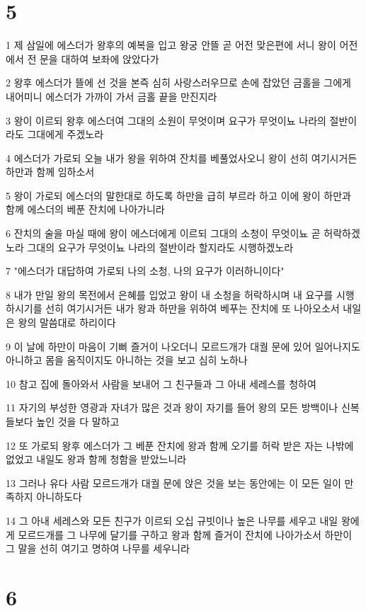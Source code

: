 \chapter{5}

\par 1 제 삼일에 에스더가 왕후의 예복을 입고 왕궁 안뜰 곧 어전 맞은편에 서니 왕이 어전에서 전 문을 대하여 보좌에 앉았다가
\par 2 왕후 에스더가 뜰에 선 것을 본즉 심히 사랑스러우므로 손에 잡았던 금홀을 그에게 내어미니 에스더가 가까이 가서 금홀 끝을 만진지라
\par 3 왕이 이르되 왕후 에스더여 그대의 소원이 무엇이며 요구가 무엇이뇨 나라의 절반이라도 그대에게 주겠노라
\par 4 에스더가 가로되 오늘 내가 왕을 위하여 잔치를 베풀었사오니 왕이 선히 여기시거든 하만과 함께 임하소서
\par 5 왕이 가로되 에스더의 말한대로 하도록 하만을 급히 부르라 하고 이에 왕이 하만과 함께 에스더의 베푼 잔치에 나아가니라
\par 6 잔치의 술을 마실 때에 왕이 에스더에게 이르되 그대의 소청이 무엇이뇨 곧 허락하겠노라 그대의 요구가 무엇이뇨 나라의 절반이라 할지라도 시행하겠노라
\par 7 "에스더가 대답하여 가로되 나의 소청, 나의 요구가 이러하니이다"
\par 8 내가 만일 왕의 목전에서 은혜를 입었고 왕이 내 소청을 허락하시며 내 요구를 시행하시기를 선히 여기시거든 내가 왕과 하만을 위하여 베푸는 잔치에 또 나아오소서 내일은 왕의 말씀대로 하리이다
\par 9 이 날에 하만이 마음이 기뻐 즐거이 나오더니 모르드개가 대궐 문에 있어 일어나지도 아니하고 몸을 움직이지도 아니하는 것을 보고 심히 노하나
\par 10 참고 집에 돌아와서 사람을 보내어 그 친구들과 그 아내 세레스를 청하여
\par 11 자기의 부성한 영광과 자녀가 많은 것과 왕이 자기를 들어 왕의 모든 방백이나 신복들보다 높인 것을 다 말하고
\par 12 또 가로되 왕후 에스더가 그 베푼 잔치에 왕과 함께 오기를 허락 받은 자는 나밖에 없었고 내일도 왕과 함께 청함을 받았느니라
\par 13 그러나 유다 사람 모르드개가 대궐 문에 앉은 것을 보는 동안에는 이 모든 일이 만족하지 아니하도다
\par 14 그 아내 세레스와 모든 친구가 이르되 오십 규빗이나 높은 나무를 세우고 내일 왕에게 모르드개를 그 나무에 달기를 구하고 왕과 함께 즐거이 잔치에 나아가소서 하만이 그 말을 선히 여기고 명하여 나무를 세우니라

\chapter{6}


